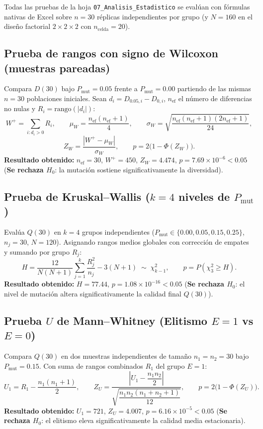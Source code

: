 \documentclass[11pt,a4paper]{article}
\begin{document}
Todas las pruebas de la hoja \texttt{07\_Analisis\_Estadistico} se eval\'uan con f\'ormulas nativas de Excel sobre $n=30$ r\'eplicas independientes por grupo (y $N=160$ en el dise\~no factorial $2\times 2\times 2$ con $n_{\text{celda}}=20$).

\subsection{Prueba de rangos con signo de Wilcoxon (muestras pareadas)}
Compara $D(30)$ bajo $P_{\text{mut}} = 0.05$ frente a $P_{\text{mut}} = 0.00$ partiendo de las mismas $n=30$ poblaciones iniciales. Sean $d_i = D_{0.05,i} - D_{0,i}$, $n_{\text{ef}}$ el n\'umero de diferencias no nulas y $R_i = \text{rango}(|d_i|)$:
\begin{equation}
W^+ = \sum_{i : d_i > 0} R_i, \qquad
\mu_W = \frac{n_{\text{ef}}(n_{\text{ef}}+1)}{4}, \qquad
\sigma_W = \sqrt{\frac{n_{\text{ef}}(n_{\text{ef}}+1)(2n_{\text{ef}}+1)}{24}},
\end{equation}
\begin{equation}
Z_W = \frac{|W^+ - \mu_W|}{\sigma_W}, \qquad p = 2\big(1 - \Phi(Z_W)\big).
\end{equation}
\textbf{Resultado obtenido:} $n_{\text{ef}} = 30$, $W^+ = 450$, $Z_W = 4.474$, $p = 7.69 \times 10^{-6} < 0.05$ (\textbf{Se rechaza $H_0$}: la mutaci\'on sostiene significativamente la diversidad).

\subsection{Prueba de Kruskal--Wallis ($k = 4$ niveles de $P_{\text{mut}}$)}
Eval\'ua $Q(30)$ en $k=4$ grupos independientes ($P_{\text{mut}} \in \{0.00, 0.05, 0.15, 0.25\}$, $n_j = 30$, $N = 120$). Asignando rangos medios globales con correcci\'on de empates y sumando por grupo $R_j$:
\begin{equation}
H = \frac{12}{N(N+1)}\sum_{j=1}^{k}\frac{R_j^2}{n_j} - 3(N+1) \;\sim\; \chi^2_{k-1}, \qquad
p = P\!\left(\chi^2_{3} \ge H\right).
\end{equation}
\textbf{Resultado obtenido:} $H = 77.44$, $p = 1.08 \times 10^{-16} < 0.05$ (\textbf{Se rechaza $H_0$}: el nivel de mutaci\'on altera significativamente la calidad final $Q(30)$).

\subsection{Prueba $U$ de Mann--Whitney (Elitismo $E=1$ vs $E=0$)}
Compara $Q(30)$ en dos muestras independientes de tama\~no $n_1 = n_2 = 30$ bajo $P_{\text{mut}} = 0.15$. Con suma de rangos combinados $R_1$ del grupo $E=1$:
\begin{equation}
U_1 = R_1 - \frac{n_1(n_1+1)}{2}, \qquad
Z_U = \frac{\left|U_1 - \dfrac{n_1 n_2}{2}\right|}{\sqrt{\dfrac{n_1 n_2 (n_1 + n_2 + 1)}{12}}}, \qquad
p = 2\big(1 - \Phi(Z_U)\big).
\end{equation}
\textbf{Resultado obtenido:} $U_1 = 721$, $Z_U = 4.007$, $p = 6.16 \times 10^{-5} < 0.05$ (\textbf{Se rechaza $H_0$}: el elitismo eleva significativamente la calidad media estacionaria).
\end{document}
